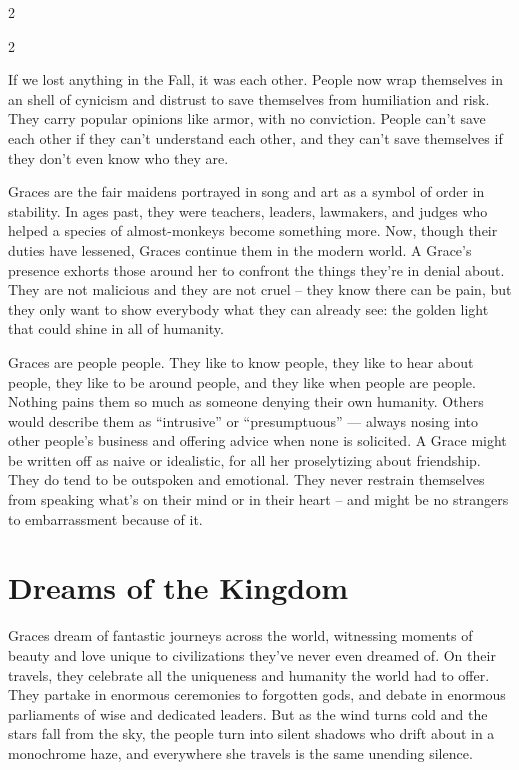 \begin{multicols}{2}
\end{multicols}\newpage{}
\label{scha:Grace}\begin{multicols}{2}\raggedcolumns

\noindent If we lost anything in the Fall, it was each other. People now wrap themselves in an shell of cynicism and distrust to save themselves from humiliation and risk. They carry popular opinions like armor, with no conviction. People can't save each other if they can't understand each other, and they can't save themselves if they don't even know who they are.

Graces are the fair maidens portrayed in song and art as a symbol of order in stability. In ages past, they were teachers, leaders, lawmakers, and judges who helped a species of almost-monkeys become something more. Now, though their duties have lessened, Graces continue them in the modern world. A Grace's presence exhorts those around her to confront the things they're in denial about. They are not malicious and they are not cruel – they know there can be pain, but they only want to show everybody what they can already see: the golden light that could shine in all of humanity.
 
Graces are people people. They like to know people, they like to hear about people, they like to be around people, and they like when people are people. Nothing pains them so much as someone denying their own humanity. Others would describe them as “intrusive” or “presumptuous” — always nosing into other people's business and offering advice when none is solicited. A Grace might be written off as naive or idealistic, for all her proselytizing about friendship. They do tend to be outspoken and emotional. They never restrain themselves from speaking what's on their mind or in their heart – and might be no strangers to embarrassment because of it. 

\section*{Dreams of the Kingdom}
Graces dream of fantastic journeys across the world, witnessing moments of beauty and love unique to civilizations they've never even dreamed of. On their travels, they celebrate all the uniqueness and humanity the world had to offer. They partake in enormous ceremonies to forgotten gods, and debate in enormous parliaments of wise and dedicated leaders. But as the wind turns cold and the stars fall from the sky, the people turn into silent shadows who drift about in a monochrome haze, and everywhere she travels is the same unending silence. 


\end{multicols}
